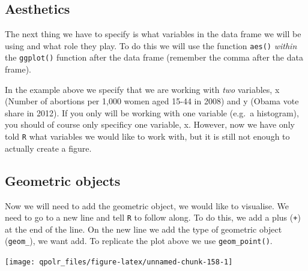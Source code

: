 \documentclass[12pt,oneside]{reedthesis}
\theoremstyle{definition}
\theoremstyle{definition}
\theoremstyle{definition}
\theoremstyle{remark}
\begin{document}
  \subsection{Aesthetics}\label{aesthetics}
  
  The next thing we have to specify is what variables in the data frame we
  will be using and what role they play. To do this we will use the
  function \texttt{aes()} \emph{within} the \texttt{ggplot()} function
  after the data frame (remember the comma after the data frame).
  \begin{Shaded}
  \begin{Highlighting}[]
  \NormalTok{(}
  \end{Highlighting}
  \end{Shaded}
  In the example above we specify that we are working with \emph{two}
  variables, x (Number of abortions per 1,000 women aged 15-44 in 2008)
  and y (Obama vote share in 2012). If you only will be working with one
  variable (e.g.~a histogram), you should of course only specificy one
  variable, x. However, now we have only told \texttt{R} what variables we
  would like to work with, but it is still not enough to actually create a
  figure.
  
  \subsection{Geometric objects}\label{geometric-objects}
  
  Now we will need to add the geometric object, we would like to
  visualise. We need to go to a new line and tell \texttt{R} to follow
  along. To do this, we add a plus (\texttt{+}) at the end of the line. On
  the new line we add the type of geometric object (\texttt{geom\_}), we
  want add. To replicate the plot above we use \texttt{geom\_point()}.
  \begin{Shaded}
  \begin{Highlighting}[]
  \NormalTok{(}\OperatorTok{+}
  \StringTok{  }\NormalTok{()}
  \end{Highlighting}
  \end{Shaded}
  \begin{center}\texttt{[image: qpolr\_files/figure-latex/unnamed-chunk-158-1]} \end{center}
  
\end{document}
